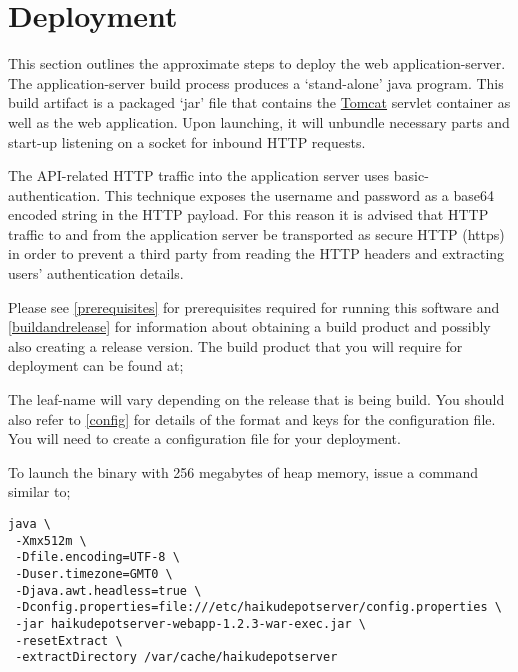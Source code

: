
\section{Deployment}

This section outlines the approximate steps to deploy the web application-server.  The application-server build process produces a  `stand-alone' java program.  This build artifact is a packaged `jar' file that contains the \href{http://tomcat.apache.org}{Tomcat} servlet container as well as the web application.  Upon launching, it will unbundle necessary parts and start-up listening on a socket for inbound HTTP requests.


The API-related HTTP traffic into the application server uses basic-authentication.  This technique exposes the username and password as a base64 encoded string in the HTTP payload.  For this reason it is advised that HTTP traffic to and from the application server be transported as secure HTTP (https) in order to prevent a third party from reading the HTTP headers and extracting users' authentication details.

Please see \ref{prerequisites} for prerequisites required for running this software and \ref{buildandrelease} for information about obtaining a build product and possibly also creating a release version.  The build product that you will require for deployment can be found at;


The leaf-name will vary depending on the release that is being build.  You should also refer to \ref{config} for details of the format and keys for the configuration file.  You will need to create a configuration file for your deployment.

To launch the binary with 256 megabytes of heap memory, issue a command similar to;

\begin{verbatim}
java \
 -Xmx512m \
 -Dfile.encoding=UTF-8 \
 -Duser.timezone=GMT0 \
 -Djava.awt.headless=true \
 -Dconfig.properties=file:///etc/haikudepotserver/config.properties \
 -jar haikudepotserver-webapp-1.2.3-war-exec.jar \
 -resetExtract \
 -extractDirectory /var/cache/haikudepotserver
\end{verbatim}

